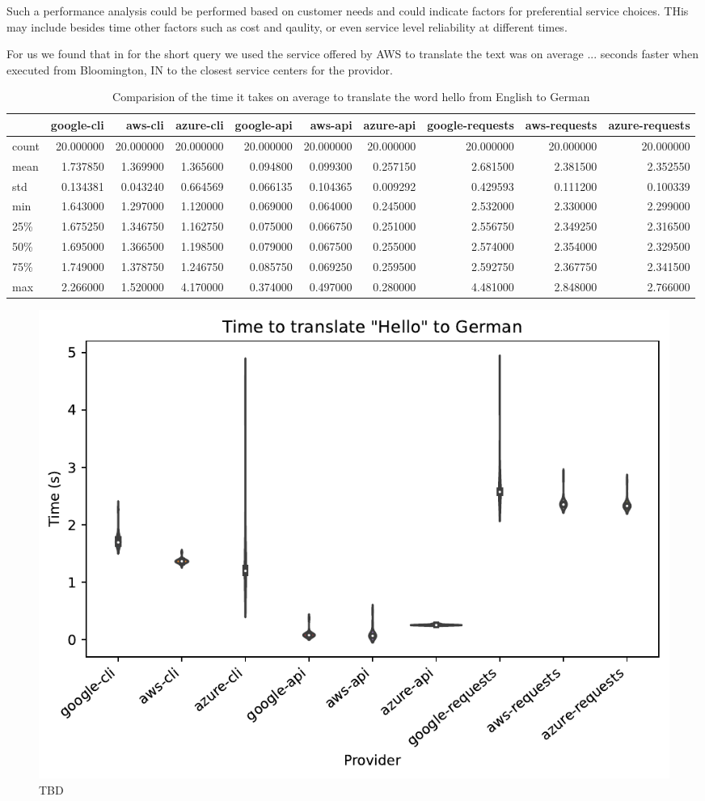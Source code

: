 Such a performance analysis could be performed based on customer needs
and could indicate factors for preferential service choices. THis may
include besides time other factors such as cost and qaulity, or even
service level reliability at different times.

For us we found that in for the short query we used the service
offered by AWS to translate the text was on average ...  seconds
faster when executed from Bloomington, IN to the closest service
centers for the providor.


\begin{table}[htb]

\caption{Comparision of the time it takes on average to translate the word hello from English to German}

\begin{tabular}{lrrrrrrrrr}
 & google-cli & aws-cli & azure-cli & google-api & aws-api & azure-api & google-requests & aws-requests & azure-requests \\
 \hline
count & 20.000000 & 20.000000 & 20.000000 & 20.000000 & 20.000000 & 20.000000 & 20.000000 & 20.000000 & 20.000000 \\
mean & 1.737850 & 1.369900 & 1.365600 & 0.094800 & 0.099300 & 0.257150 & 2.681500 & 2.381500 & 2.352550 \\
std & 0.134381 & 0.043240 & 0.664569 & 0.066135 & 0.104365 & 0.009292 & 0.429593 & 0.111200 & 0.100339 \\
min & 1.643000 & 1.297000 & 1.120000 & 0.069000 & 0.064000 & 0.245000 & 2.532000 & 2.330000 & 2.299000 \\
25\% & 1.675250 & 1.346750 & 1.162750 & 0.075000 & 0.066750 & 0.251000 & 2.556750 & 2.349250 & 2.316500 \\
50\% & 1.695000 & 1.366500 & 1.198500 & 0.079000 & 0.067500 & 0.255000 & 2.574000 & 2.354000 & 2.329500 \\
75\% & 1.749000 & 1.378750 & 1.246750 & 0.085750 & 0.069250 & 0.259500 & 2.592750 & 2.367750 & 2.341500 \\
max & 2.266000 & 1.520000 & 4.170000 & 0.374000 & 0.497000 & 0.280000 & 4.481000 & 2.848000 & 2.766000 \\
\hline
\end{tabular}
\end{table}

\begin{figure}[htb]

\centering
\includegraphics[width=1.0\columnwidth]{images/nlp-benchmark.pdf}
\caption{TBD}

\end{figure}

